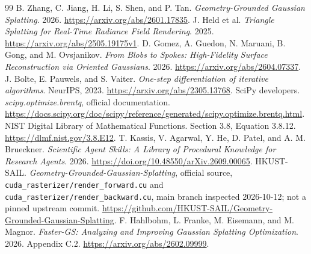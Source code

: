 \documentclass[11pt,a4paper]{article}
\begin{document}
\begin{thebibliography}{99}
B. Zhang, C. Jiang, H. Li, S. Shen, and P. Tan.
\emph{Geometry-Grounded Gaussian Splatting}. 2026.
\url{https://arxiv.org/abs/2601.17835}.
J. Held et al.
\emph{Triangle Splatting for Real-Time Radiance Field Rendering}.
2025. \url{https://arxiv.org/abs/2505.19175v1}.
D. Gomez, A. Guedon, N. Maruani, B. Gong, and M. Ovsjanikov.
\emph{From Blobs to Spokes: High-Fidelity Surface Reconstruction via Oriented
Gaussians}. 2026. \url{https://arxiv.org/abs/2604.07337}.
J. Bolte, E. Pauwels, and S. Vaiter.
\emph{One-step differentiation of iterative algorithms}. NeurIPS, 2023.
\url{https://arxiv.org/abs/2305.13768}.
SciPy developers. \emph{scipy.optimize.brentq}, official documentation.
\url{https://docs.scipy.org/doc/scipy/reference/generated/scipy.optimize.brentq.html}.
NIST Digital Library of Mathematical Functions. Section 3.8, Equation 3.8.12.
\url{https://dlmf.nist.gov/3.8.E12}.
T. Kassis, V. Agarwal, Y. He, D. Patel, and A. M. Brueckner.
\emph{Scientific Agent Skills: A Library of Procedural Knowledge for Research
Agents}. 2026. \url{https://doi.org/10.48550/arXiv.2609.00065}.
HKUST-SAIL. \emph{Geometry-Grounded-Gaussian-Splatting}, official source,
\texttt{cuda\_rasterizer/render\_forward.cu} and
\texttt{cuda\_rasterizer/render\_backward.cu}, main branch inspected
2026-10-12; not a pinned upstream commit.
\url{https://github.com/HKUST-SAIL/Geometry-Grounded-Gaussian-Splatting}.
F. Hahlbohm, L. Franke, M. Eisemann, and M. Magnor.
\emph{Faster-GS: Analyzing and Improving Gaussian Splatting Optimization}.
2026. Appendix C.2. \url{https://arxiv.org/abs/2602.09999}.
\end{thebibliography}
\end{document}
